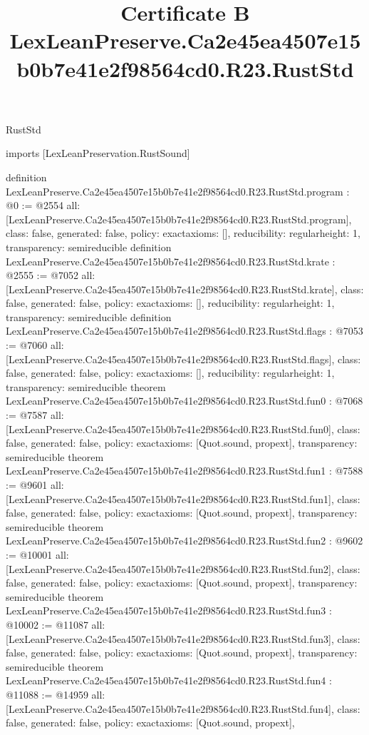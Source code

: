 \begin{lexlean}{RustStd}
\title{Certificate B LexLeanPreserve.Ca2e45ea4507e15b0b7e41e2f98564cd0.R23.RustStd}
\begin{coremodule}
imports [LexLeanPreservation.RustSound]

definition LexLeanPreserve.Ca2e45ea4507e15b0b7e41e2f98564cd0.R23.RustStd.program : @0 := @2554 {
  all: [LexLeanPreserve.Ca2e45ea4507e15b0b7e41e2f98564cd0.R23.RustStd.program],
  class: false,
  generated: false,
  policy: exact{axioms: []},
  reducibility: regular{height: 1},
  transparency: semireducible
}
definition LexLeanPreserve.Ca2e45ea4507e15b0b7e41e2f98564cd0.R23.RustStd.krate : @2555 := @7052 {
  all: [LexLeanPreserve.Ca2e45ea4507e15b0b7e41e2f98564cd0.R23.RustStd.krate],
  class: false,
  generated: false,
  policy: exact{axioms: []},
  reducibility: regular{height: 1},
  transparency: semireducible
}
definition LexLeanPreserve.Ca2e45ea4507e15b0b7e41e2f98564cd0.R23.RustStd.flags : @7053 := @7060 {
  all: [LexLeanPreserve.Ca2e45ea4507e15b0b7e41e2f98564cd0.R23.RustStd.flags],
  class: false,
  generated: false,
  policy: exact{axioms: []},
  reducibility: regular{height: 1},
  transparency: semireducible
}
theorem LexLeanPreserve.Ca2e45ea4507e15b0b7e41e2f98564cd0.R23.RustStd.fun0 : @7068 := @7587 {
  all: [LexLeanPreserve.Ca2e45ea4507e15b0b7e41e2f98564cd0.R23.RustStd.fun0],
  class: false,
  generated: false,
  policy: exact{axioms: [Quot.sound, propext]},
  transparency: semireducible
}
theorem LexLeanPreserve.Ca2e45ea4507e15b0b7e41e2f98564cd0.R23.RustStd.fun1 : @7588 := @9601 {
  all: [LexLeanPreserve.Ca2e45ea4507e15b0b7e41e2f98564cd0.R23.RustStd.fun1],
  class: false,
  generated: false,
  policy: exact{axioms: [Quot.sound, propext]},
  transparency: semireducible
}
theorem LexLeanPreserve.Ca2e45ea4507e15b0b7e41e2f98564cd0.R23.RustStd.fun2 : @9602 := @10001 {
  all: [LexLeanPreserve.Ca2e45ea4507e15b0b7e41e2f98564cd0.R23.RustStd.fun2],
  class: false,
  generated: false,
  policy: exact{axioms: [Quot.sound, propext]},
  transparency: semireducible
}
theorem LexLeanPreserve.Ca2e45ea4507e15b0b7e41e2f98564cd0.R23.RustStd.fun3 : @10002 := @11087 {
  all: [LexLeanPreserve.Ca2e45ea4507e15b0b7e41e2f98564cd0.R23.RustStd.fun3],
  class: false,
  generated: false,
  policy: exact{axioms: [Quot.sound, propext]},
  transparency: semireducible
}
theorem LexLeanPreserve.Ca2e45ea4507e15b0b7e41e2f98564cd0.R23.RustStd.fun4 : @11088 := @14959 {
  all: [LexLeanPreserve.Ca2e45ea4507e15b0b7e41e2f98564cd0.R23.RustStd.fun4],
  class: false,
  generated: false,
  policy: exact{axioms: [Quot.sound, propext]},
}
\end{coremodule}
\end{lexlean}
